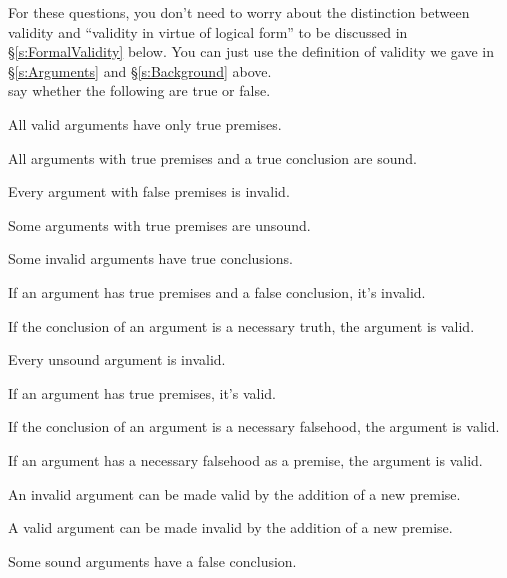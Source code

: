 \practiceproblems

For these questions, you don't need to worry about the distinction between validity and ``validity in virtue of logical form'' to be discussed in \S\ref{s:FormalValidity}  below.  You can just use the definition of validity we gave in \S\ref{s:Arguments} and \S \ref{s:Background} above.\\


\problempart say whether the following are true or false.

\begin{earg}
\item All valid arguments have only true premises.
\item All arguments with true premises and a true conclusion are sound.
\item Every argument with false premises is invalid.
\item Some arguments with true premises are unsound.
\item Some invalid arguments have true conclusions.
\item If an argument has true premises and a false conclusion, it's invalid.
\item If the conclusion of an argument is a necessary truth, the argument is valid.
\item Every unsound argument is invalid.
\item If an argument has true premises, it's valid.
\item If the conclusion of an argument is a necessary falsehood, the argument is valid.
\item If an argument has a necessary falsehood as a premise, the argument is valid.
\item An invalid argument can be made valid by the addition of a new premise.
\item A valid argument can be made invalid by the addition of a new premise.
\item Some sound arguments have a false conclusion.
\end{earg}

